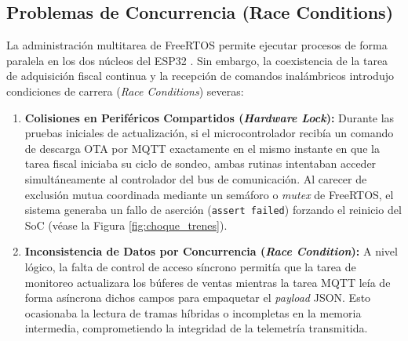 \subsection{Problemas de Concurrencia (Race Conditions)}

\par La administración multitarea de FreeRTOS permite ejecutar procesos de forma paralela en los dos núcleos del ESP32 \cite{FreeRTOS_Kernel_Ref}. Sin embargo, la coexistencia de la tarea de adquisición fiscal continua y la recepción de comandos inalámbricos introdujo condiciones de carrera (\textit{Race Conditions}) severas:

\begin{enumerate}
    \item \textbf{Colisiones en Periféricos Compartidos (\textit{Hardware Lock}):} Durante las pruebas iniciales de actualización, si el microcontrolador recibía un comando de descarga OTA por MQTT exactamente en el mismo instante en que la tarea fiscal iniciaba su ciclo de sondeo, ambas rutinas intentaban acceder simultáneamente al controlador del bus de comunicación. Al carecer de exclusión mutua coordinada mediante un semáforo o \textit{mutex} de FreeRTOS, el sistema generaba un fallo de aserción (\texttt{assert failed}) forzando el reinicio del SoC (véase la Figura \ref{fig:choque_trenes}).
    
    \item \textbf{Inconsistencia de Datos por Concurrencia (\textit{Race Condition}):} A nivel lógico, la falta de control de acceso síncrono permitía que la tarea de monitoreo actualizara los búferes de ventas mientras la tarea MQTT leía de forma asíncrona dichos campos para empaquetar el \textit{payload} JSON. Esto ocasionaba la lectura de tramas híbridas o incompletas en la memoria intermedia, comprometiendo la integridad de la telemetría transmitida.
\end{enumerate}

